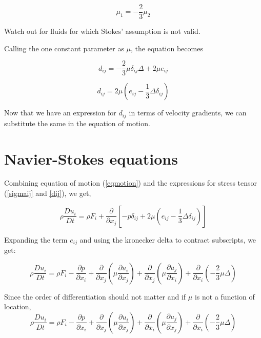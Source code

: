 \begin{equation}
\mu_1 = -\frac{2}{3} \mu_2 
\end{equation} 

Watch out for fluids for which Stokes' assumption is not valid. 

Calling the one constant parameter as $\mu$, the equation becomes

\begin{equation}
d_{ij} = - \frac{2}{3} \mu \delta_{ij} \Delta + 2 \mu e_{ij}
\end{equation} 

\begin{equation}
\label{dij}
d_{ij} = 2 \mu \left( e_{ij} - \frac{1}{3} \Delta \delta_{ij} \right)
\end{equation} 


Now that we have an expression for $d_{ij}$ in terms of velocity gradients, we can substitute the same in the equation of motion.

\section{Navier-Stokes equations}


Combining equation of motion (\ref{eqmotion}) and the expressions for stress tensor (\ref{sigmaij} and \ref{dij}), we get,

\begin{equation}
\rho \frac{Du_i}{Dt} = \rho F_i + \frac{\partial}{\partial x_j} \left[ -p\delta_{ij}+ 2 \mu \left( e_{ij} - \frac{1}{3} \Delta \delta_{ij}\right)\right]
\end{equation} 

Expanding the term $e_{ij}$ and using the kronecker delta to contract subscripts, we get:

\begin{equation}
\rho \frac{Du_i}{Dt} = \rho F_i -  \frac{\partial p}{\partial x_i} +  
\frac{\partial}{\partial x_j} \left( \mu \frac{\partial u_i}{\partial x_j} \right) + 
\frac{\partial}{\partial x_j} \left( \mu \frac{\partial u_j}{\partial x_i} \right) + 
\frac{\partial}{\partial x_i} \left( -\frac{2}{3} \mu \Delta \right) 
\end{equation} 

Since the order of differentiation should not matter and if $\mu$ is not a function of location,
\begin{equation}
\rho \frac{Du_i}{Dt} = \rho F_i -  \frac{\partial p}{\partial x_i} +  
\frac{\partial}{\partial x_j} \left( \mu \frac{\partial u_i}{\partial x_j} \right) + 
\frac{\partial}{\partial x_i} \left( \mu \frac{\partial u_j}{\partial x_j} \right) + 
\frac{\partial}{\partial x_i} \left( -\frac{2}{3} \mu \Delta \right) 
\end{equation} 

